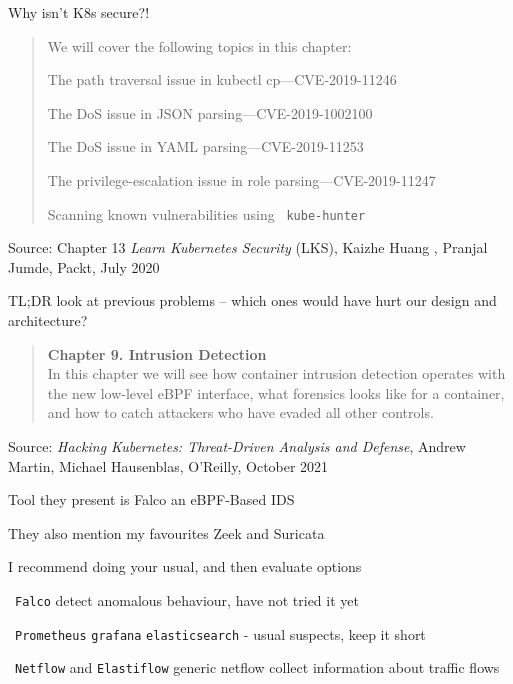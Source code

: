 \documentclass[Screen16to9,17pt]{foils}
\begin{document}
Why isn't K8s secure?!
\begin{quote}
We will cover the following topics in this chapter:
\begin{list2}
\item The path traversal issue in kubectl cp—CVE-2019-11246
\item The DoS issue in JSON parsing—CVE-2019-1002100
\item The DoS issue in YAML parsing—CVE-2019-11253
\item The privilege-escalation issue in role parsing—CVE-2019-11247
\item Scanning known vulnerabilities using \faWrench\ \verb+kube-hunter+
\end{list2}
\end{quote}
Source: Chapter 13 \emph{Learn Kubernetes Security} (LKS), Kaizhe Huang , Pranjal Jumde, Packt, July 2020

TL;DR look at previous problems -- which ones would have hurt our design and architecture?



\begin{quote}
{\bf Chapter 9. Intrusion Detection}\\
In this chapter we will see how container intrusion detection operates with the new low-level eBPF interface, what forensics looks like for a container, and how to catch attackers who have evaded all other controls.
\end{quote}
Source: \emph{Hacking Kubernetes: Threat-Driven Analysis and Defense}, Andrew Martin, Michael Hausenblas, O'Reilly, October 2021

\begin{list2}
\item Tool they present is Falco an eBPF-Based IDS
\item They also mention my favourites Zeek  and Suricata 
\item I recommend doing your usual, and then evaluate options
\end{list2}



\begin{list2}
\item \faWrench\ \verb+Falco+ detect anomalous behaviour, have not tried it yet
\item \faWrench\ \verb+Prometheus+ \verb+grafana+ \verb+elasticsearch+ - usual suspects, keep it short
\item \faWrench\ \verb+Netflow+ and \verb+Elastiflow+ generic netflow collect information about traffic flows
\end{list2}
\end{document}
